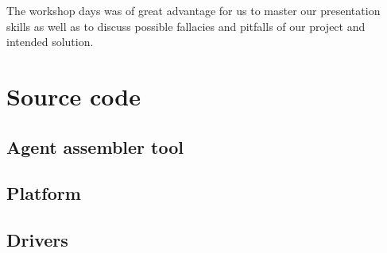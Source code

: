 \documentclass{scrreprt}
\begin{document}
The workshop days was of great advantage for us to master our presentation skills as well as
to discuss possible fallacies and pitfalls of our project and intended solution.



	

	


\appendix

\chapter{Source code}

\section{Agent assembler tool}

\section{Platform}

\section{Drivers}
\end{document}
